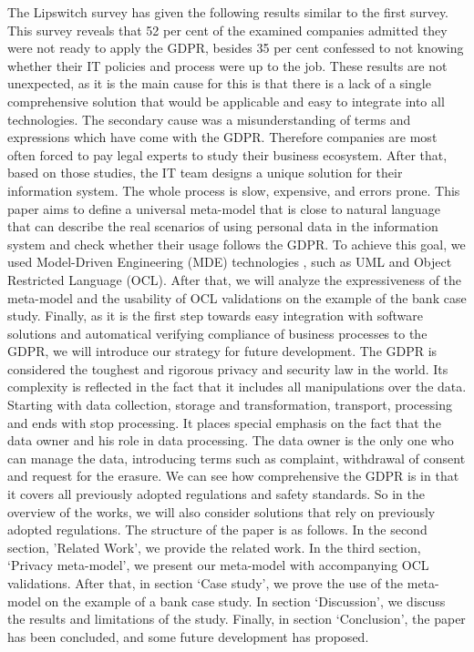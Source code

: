 \documentclass[11pt,english]{article}
\begin{document}
\quad The Lipswitch survey \cite{lipswitch} has given the following results similar to the first survey. This survey reveals that 52 per cent of the examined companies admitted they were not ready to apply the GDPR, besides 35 per cent confessed to not knowing whether their IT policies and process were up to the job. These results are not unexpected, as it is the main cause for this is that there is a lack of a single comprehensive solution that would be applicable and easy to integrate into all technologies. The secondary cause was a misunderstanding of terms and expressions which have come with the GDPR. Therefore companies are most often forced to pay legal experts to study their business ecosystem. After that, based on those studies, the IT team designs a unique solution for their information system. The whole process is slow, expensive, and errors prone. \newline This paper aims to define a universal meta-model that is close to natural language that can describe the real scenarios of using personal data in the information system and check whether their usage follows the GDPR. To achieve this goal, we used Model-Driven Engineering (MDE) technologies \cite{mde}, such as UML \cite{uml} and Object Restricted Language (OCL). After that, we will analyze the expressiveness of the meta-model and the usability of OCL validations on the example of the bank case study. Finally, as it is the first step towards easy integration with software solutions and automatical verifying compliance of business processes to the GDPR, we will introduce our strategy for future development. \newline The GDPR is considered the toughest and rigorous privacy and security law in the world.  Its complexity is reflected in the fact that it includes all manipulations over the data. Starting with data collection, storage and transformation, transport, processing and ends with stop processing. It places special emphasis on the fact that the data owner and his role in data processing. The data owner is the only one who can manage the data, introducing terms such as complaint, withdrawal of consent and request for the erasure. We can see how comprehensive the GDPR is in that it covers all previously adopted regulations and safety standards. So in the overview of the works, we will also consider solutions that rely on previously adopted regulations. \newline The structure of the paper is as follows. In the second section, 'Related Work', we provide the related work. In the third section, ‘Privacy meta-model’, we present our meta-model with accompanying OCL validations. After that, in section ‘Case study’, we prove the use of the meta-model on the example of a bank case study. In section ‘Discussion’,  we discuss the results and limitations of the study. Finally, in section ‘Conclusion’, the paper has been concluded, and some future development has proposed.
\end{document}
